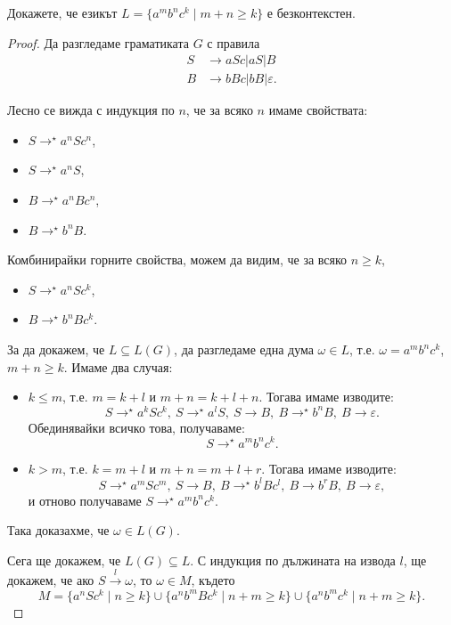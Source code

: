 \begin{problem}
  Докажете, че езикът $L = \{a^mb^nc^k\mid m+n \geq k\}$ е безконтекстен.
\end{problem}
\begin{proof}
  Да разгледаме граматиката $G$ с правила
  \begin{align*}
    S& \rightarrow aSc\vert aS \vert B\\
    B& \rightarrow bBc\vert bB\vert\varepsilon.
  \end{align*}
  
  Лесно се вижда с индукция по $n$, че за всяко $n$ имаме свойствата:
  \begin{itemize}
  \item 
    $S \rightarrow^\star a^nSc^n$,
  \item
    $S \rightarrow^\star a^nS$,
  \item
    $B \rightarrow^\star a^nBc^n$,
  \item
    $B \rightarrow^\star b^nB$.
  \end{itemize}
  Комбинирайки горните свойства, можем да видим, че за всяко $n \geq k$,
  \begin{itemize}
  \item 
    $S \rightarrow^\star a^nSc^k$,
  \item
    $B \rightarrow^\star b^nBc^k$.
  \end{itemize}
  За да докажем, че $L \subseteq L(G)$, 
  да разгледаме една дума $\omega \in L$, т.е. $\omega = a^mb^nc^k$, $m+n \geq k$.
  Имаме два случая:
  \begin{itemize}
  \item 
    $k \leq m$, т.е. $m = k+l$ и $m+n = k+l+n$.
    Тогава имаме изводите:
    \[S \rightarrow^\star a^kSc^k,\ S \rightarrow^\star a^lS,\ S \rightarrow B,\ B \rightarrow^\star b^nB,\ B \rightarrow \varepsilon.\]
    Обединявайки всичко това, получаваме:
    \[S \rightarrow^\star a^mb^nc^k.\]
  \item
    $k > m$, т.е. $k = m+l$ и $m+n = m+l+r$.
    Тогава имаме изводите:
    \[S \rightarrow^\star a^mSc^m,\ S\rightarrow B,\ B\rightarrow^\star b^lBc^l,\ B\rightarrow b^rB,\ B\rightarrow\varepsilon,\]
    и отново получаваме $S \rightarrow^\star a^mb^nc^k$.
  \end{itemize}
  Така доказахме, че $\omega \in L(G)$.
  
  Сега ще докажем, че $L(G) \subseteq L$.
  С индукция по дължината на извода $l$,
  ще докажем, че ако $S \stackrel{l}{\rightarrow}\omega$, то $\omega \in M$, където
  \[M = \{a^nSc^k\mid n\geq k\}\cup\{a^nb^mBc^k\mid n+m\geq k\}\cup\{a^nb^mc^k\mid n+m\geq k\}.\]
  

\end{proof}
